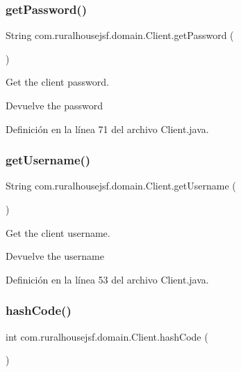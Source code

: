 \subsubsection{\texorpdfstring{getPassword()}{getPassword()}}
{\footnotesize\ttfamily String com.\+ruralhousejsf.\+domain.\+Client.\+get\+Password (\begin{DoxyParamCaption}{ }\end{DoxyParamCaption})}



Get the client password. 

\begin{DoxyReturn}{Devuelve}
the password 
\end{DoxyReturn}


Definición en la línea 71 del archivo Client.\+java.

\mbox{\label{a00164_a0ae33acded961afcf93152d917bf1aa1}} 
\subsubsection{\texorpdfstring{getUsername()}{getUsername()}}
{\footnotesize\ttfamily String com.\+ruralhousejsf.\+domain.\+Client.\+get\+Username (\begin{DoxyParamCaption}{ }\end{DoxyParamCaption})}



Get the client username. 

\begin{DoxyReturn}{Devuelve}
the username 
\end{DoxyReturn}


Definición en la línea 53 del archivo Client.\+java.

\mbox{\label{a00164_aaa86bcfe5247f3aeae9daec9600cf70c}} 
\subsubsection{\texorpdfstring{hashCode()}{hashCode()}}
{\footnotesize\ttfamily int com.\+ruralhousejsf.\+domain.\+Client.\+hash\+Code (\begin{DoxyParamCaption}{ }\end{DoxyParamCaption})}



